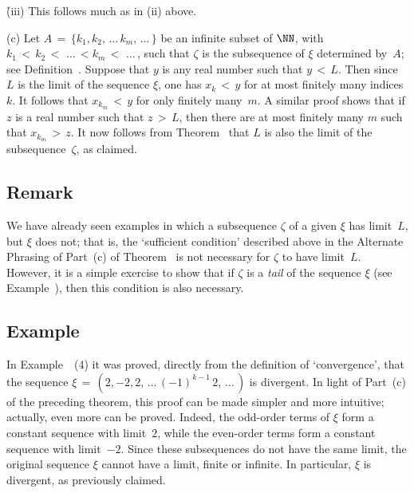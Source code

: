         \h (iii) This follows much as in (ii) above.

\V

        (c)  Let $A \,=\, \{k_{1}, k_{2},\,{\ldots}\,k_{m},\,{\ldots}\,\}$ be an infinite subset of ${\NN}$, with $k_{1}\,<\,k_{2}\,<\,\,{\ldots}\,< k_{m}\,<\, \,{\ldots}\,$,
    such that ${\zeta}$ is the subsequence of ${\xi}$ determined by~$A$; see Definition~. Suppose that $y$ is any real number such that $y\,<\,L$. Then since $L$ is the limit of the sequence ${\xi}$,
    one has $x_{k}\,<\,y$ for at most finitely many indices $k$. It follows that $x_{k_{m}}\,<\,y$ for only finitely many~$m$.
     A similar proof shows that if $z$ is a real number such that $z\,>\,L$, then there are at most finitely many $m$ such that $x_{k_{m}}\,>\,z$.
        It now follows from Theorem~ that $L$ is also the limit of the subsequence~${\zeta}$, as claimed.

\V

            \subsection{\small{\bf Remark}}
            \label{RemrkC20.11B}

            We have already seen examples in which a subsequence ${\zeta}$ of a given ${\xi}$ has limit~$L$, but ${\xi}$ does not; that is,
    the  `sufficient condition' described above in the Alternate Phrasing of Part~(c) of Theorem~ is not necessary for ${\zeta}$ to have limit~$L$.
    However, it is a simple exercise to show that if ${\zeta}$ is a {\em tail} of the sequence ${\xi}$ (see Example~), then this condition is also necessary. %

\VV

            \subsection{\small{\bf Example}}
            \label{ExampC20.11A}

\V%

        In Example~~(4) it was proved, directly from the definition of `convergence', that the sequence ${\xi} \,=\, (2, -2, 2, \,{\ldots}\,(-1)^{k-1}\,2,\,{\ldots}\,)$ is divergent.
    In light of Part~(c) of the preceding theorem, this proof can be made simpler and more intuitive; actually, even more can be proved.
    Indeed, the odd-order terms of ${\xi}$ form a constant sequence with limit~$2$, while the even-order terms form a constant sequence with limit~$-2$.
    Since these subsequences do not have the same limit, the original sequence ${\xi}$ cannot have a limit, finite or infinite. In particular, ${\xi}$ is divergent, as previously claimed.

